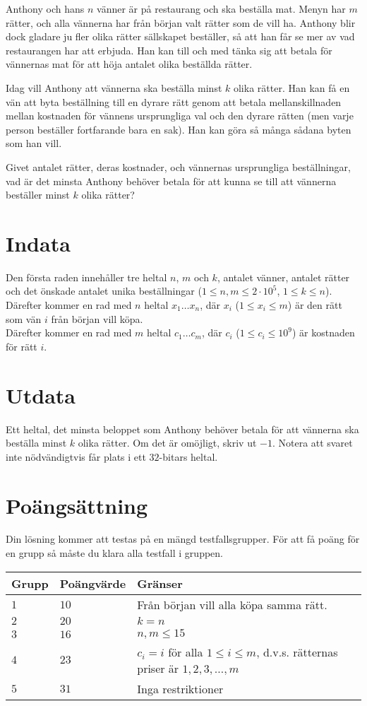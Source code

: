 Anthony och hans $n$ vänner är på restaurang och ska beställa mat. Menyn har $m$ rätter, och alla vännerna har från början valt rätter som de vill ha. Anthony blir dock gladare ju fler olika rätter sällskapet beställer, så att han får se mer av vad restaurangen har att erbjuda. Han kan till och med tänka sig att betala för vännernas mat för att höja antalet olika beställda rätter.

Idag vill Anthony att vännerna ska beställa minst $k$ olika rätter. Han kan få en vän att byta beställning till en dyrare rätt genom att betala mellanskillnaden mellan kostnaden för vännens ursprungliga val och den dyrare rätten (men varje person beställer fortfarande bara en sak). Han kan göra så många sådana byten som han vill.

Givet antalet rätter, deras kostnader, och vännernas ursprungliga beställningar, vad är det minsta Anthony behöver betala för att kunna se till att vännerna beställer minst $k$ olika rätter?

\section*{Indata}
Den första raden innehåller tre heltal $n$, $m$ och $k$, antalet vänner, antalet rätter och det önskade antalet unika beställningar ($1 \leq n, m \leq 2 \cdot 10^5$, $1 \le k \le n$). \\
Därefter kommer en rad med $n$ heltal $x_1 \dots x_n$, där $x_i$ ($1 \leq x_i \leq m$) är den rätt som vän $i$ från början vill köpa. \\
Därefter kommer en rad med $m$ heltal $c_1 \dots c_m$, där $c_i$ ($1 \leq c_i \leq 10^9$) är kostnaden för rätt $i$.

\section*{Utdata}
Ett heltal, det minsta beloppet som Anthony behöver betala för att vännerna ska beställa minst $k$ olika rätter. Om det är omöjligt, skriv ut $-1$. Notera att svaret inte nödvändigtvis får plats i ett $32$-bitars heltal.

\section*{Poängsättning}
Din lösning kommer att testas på en mängd testfallsgrupper.
För att få poäng för en grupp så måste du klara alla testfall i gruppen.

\noindent
\begin{tabular}{| l | l | l |}
\hline
Grupp & Poängvärde & Gränser \\ \hline
$1$    & $10$         & Från början vill alla köpa samma rätt. \\ \hline
$2$    & $20$         & $k = n$ \\ \hline
$3$    & $16$         & $n, m \le 15$ \\ \hline
$4$    & $23$         & $c_i = i$ för alla $1 \leq i \leq m$, d.v.s. rätternas priser är $1, 2, 3, \dots, m$ \\ \hline
$5$    & $31$         & Inga restriktioner \\ \hline
\end{tabular}

